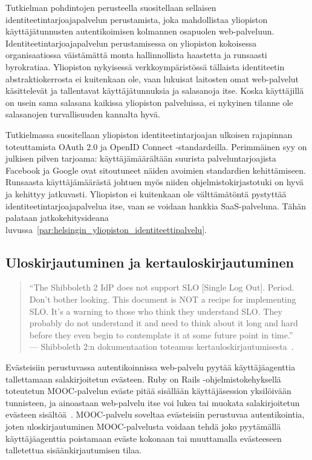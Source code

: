 \documentclass[finnish,gradu]{tktltiki}
\begin{document}
  Tutkielman pohdintojen perusteella suositellaan sellaisen identiteetintarjoajapalvelun perustamista, joka mahdollistaa yliopiston käyttäjätunnusten autentikoimisen kolmannen osapuolen web-palveluun. Identiteetintarjoajapalvelun perustamisessa on yliopiston kokoisessa organisaatiossa väistämättä monta hallinnollista haastetta ja runsaasti byrokratiaa. Yliopiston nykyisessä verkkoympäristössä tällaista identiteetin abstraktiokerrosta ei kuitenkaan ole, vaan lukuisat laitosten omat web-palvelut käsittelevät ja tallentavat käyttäjätunnuksia ja salasanoja itse. Koska käyttäjillä on usein sama salasana kaikissa yliopiston palveluissa, ei nykyinen tilanne ole salasanojen turvallisuuden kannalta hyvä.

  Tutkielmassa suositellaan yliopiston identiteetintarjoajan ulkoisen rajapinnan toteuttamista OAuth 2.0 ja OpenID Connect -standardeilla. Perimmäinen syy on julkisen pilven tarjoama: käyttäjämäärältään suurista palveluntarjoajista Facebook ja Google ovat sitoutuneet näiden avoimien standardien kehittämiseen. Runsaasta käyttäjämäärästä johtuen myös niiden ohjelmistokirjastotuki on hyvä ja kehittyy jatkuvasti. Yliopiston ei kuitenkaan ole välttämätöntä pystyttää identiteetintarjoajapalvelua itse, vaan se voidaan hankkia SaaS-palveluna. Tähän palataan jatkokehitysideana luvussa~\ref{par:helsingin_yliopiston_identiteettipalvelu}.





  \subsection{Uloskirjautuminen ja kertauloskirjautuminen} %
  \label{sub:kertauloskirjautuminen}
    \begin{quote}
      ``The Shibboleth 2 IdP does not support SLO [Single Log Out]. Period. Don't bother looking. This document is NOT a recipe for implementing SLO. It's a warning to those who think they understand SLO. They probably do not understand it and need to think about it long and hard before they even begin to contemplate it at some future point in time.''
    \\--- Shibboleth 2:n dokumentaation toteamus kertauloskirjautumisesta~\cite{shibboleth_wiki_slo}.
    \end{quote}

  Evästeisiin perustuvassa autentikoinnissa web-palvelu pyytää käyttäjäagenttia tallettamaan salakirjoitetun evästeen. Ruby on Rails -ohjelmisto\-kehyksellä toteutetun MOOC-palvelun eväste pitää sisällään käyttäjäsession yksilöivään tunnisteen, ja ainoastaan web-palvelu itse voi lukea tai muokata salakirjoitetun evästeen sisältöä~\cite{awdr_2011}. MOOC-palvelu soveltaa evästeisiin perustuvaa autentikointia, joten uloskirjautuminen MOOC-palvelusta voidaan tehdä joko pyytämällä käyttäjäagenttia poistamaan eväste kokonaan tai muuttamalla evästeeseen talletettua sisäänkirjautumisen tilaa.
\end{document}
